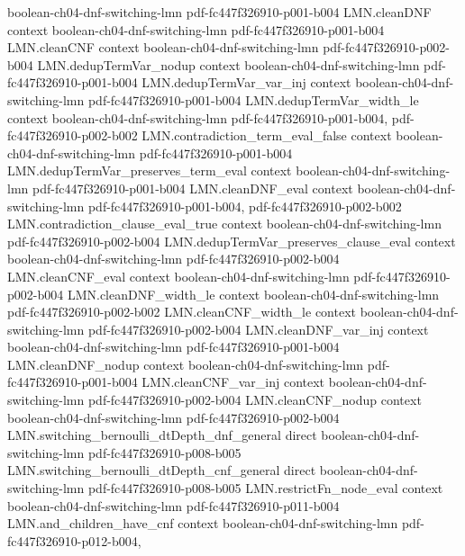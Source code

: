 \begin{lemma}
  {boolean-ch04-dnf-switching-lmn}
  {pdf-fc447f326910-p001-b004}
\proofstep
  {LMN.cleanDNF}
  {context}
  {boolean-ch04-dnf-switching-lmn}
  {pdf-fc447f326910-p001-b004}
\proofstep
  {LMN.cleanCNF}
  {context}
  {boolean-ch04-dnf-switching-lmn}
  {pdf-fc447f326910-p002-b004}
\proofstep
  {LMN.dedupTermVar_nodup}
  {context}
  {boolean-ch04-dnf-switching-lmn}
  {pdf-fc447f326910-p001-b004}
\proofstep
  {LMN.dedupTermVar_var_inj}
  {context}
  {boolean-ch04-dnf-switching-lmn}
  {pdf-fc447f326910-p001-b004}
\proofstep
  {LMN.dedupTermVar_width_le}
  {context}
  {boolean-ch04-dnf-switching-lmn}
  {pdf-fc447f326910-p001-b004,
    pdf-fc447f326910-p002-b002}
\proofstep
  {LMN.contradiction_term_eval_false}
  {context}
  {boolean-ch04-dnf-switching-lmn}
  {pdf-fc447f326910-p001-b004}
\proofstep
  {LMN.dedupTermVar_preserves_term_eval}
  {context}
  {boolean-ch04-dnf-switching-lmn}
  {pdf-fc447f326910-p001-b004}
\proofstep
  {LMN.cleanDNF_eval}
  {context}
  {boolean-ch04-dnf-switching-lmn}
  {pdf-fc447f326910-p001-b004,
    pdf-fc447f326910-p002-b002}
\proofstep
  {LMN.contradiction_clause_eval_true}
  {context}
  {boolean-ch04-dnf-switching-lmn}
  {pdf-fc447f326910-p002-b004}
\proofstep
  {LMN.dedupTermVar_preserves_clause_eval}
  {context}
  {boolean-ch04-dnf-switching-lmn}
  {pdf-fc447f326910-p002-b004}
\proofstep
  {LMN.cleanCNF_eval}
  {context}
  {boolean-ch04-dnf-switching-lmn}
  {pdf-fc447f326910-p002-b004}
\proofstep
  {LMN.cleanDNF_width_le}
  {context}
  {boolean-ch04-dnf-switching-lmn}
  {pdf-fc447f326910-p002-b002}
\proofstep
  {LMN.cleanCNF_width_le}
  {context}
  {boolean-ch04-dnf-switching-lmn}
  {pdf-fc447f326910-p002-b004}
\proofstep
  {LMN.cleanDNF_var_inj}
  {context}
  {boolean-ch04-dnf-switching-lmn}
  {pdf-fc447f326910-p001-b004}
\proofstep
  {LMN.cleanDNF_nodup}
  {context}
  {boolean-ch04-dnf-switching-lmn}
  {pdf-fc447f326910-p001-b004}
\proofstep
  {LMN.cleanCNF_var_inj}
  {context}
  {boolean-ch04-dnf-switching-lmn}
  {pdf-fc447f326910-p002-b004}
\proofstep
  {LMN.cleanCNF_nodup}
  {context}
  {boolean-ch04-dnf-switching-lmn}
  {pdf-fc447f326910-p002-b004}
\proofstep
  {LMN.switching_bernoulli_dtDepth_dnf_general}
  {direct}
  {boolean-ch04-dnf-switching-lmn}
  {pdf-fc447f326910-p008-b005}
\proofstep
  {LMN.switching_bernoulli_dtDepth_cnf_general}
  {direct}
  {boolean-ch04-dnf-switching-lmn}
  {pdf-fc447f326910-p008-b005}
\proofstep
  {LMN.restrictFn_node_eval}
  {context}
  {boolean-ch04-dnf-switching-lmn}
  {pdf-fc447f326910-p011-b004}
\proofstep
  {LMN.and_children_have_cnf}
  {context}
  {boolean-ch04-dnf-switching-lmn}
  {pdf-fc447f326910-p012-b004,
}
\end{lemma}
